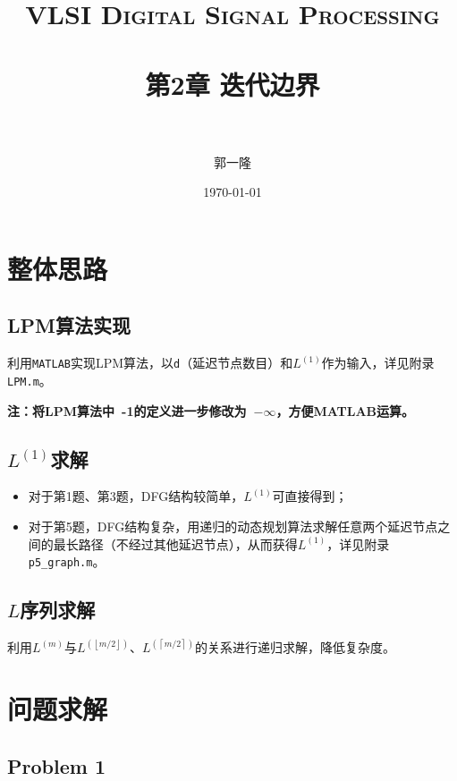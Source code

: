 \documentclass[paper=a4, fontsize=11pt]{scrartcl} %
\title{	
\normalfont \normalsize 
\textsc{VLSI Digital Signal Processing} \\ [25pt] %
\horrule{0.5pt} \\[0.4cm] %
\huge 第2章 迭代边界 \\ %
\horrule{2pt} \\[0.5cm] %
}
\author{郭一隆} %
\date{\normalsize\today} %
\begin{document}
\maketitle %

\section{整体思路}
\subsection{LPM算法实现} %
\label{sub:lpm算法实现}

利用\texttt{MATLAB}实现LPM算法，以\texttt{d}（延迟节点数目）和$L^{(1)}$作为输入，详见附录\texttt{LPM.m}。

\textbf{注：将LPM算法中~-1的定义进一步修改为~$-\infty$，方便MATLAB运算。}


\subsection{$L^{(1)}$求解} %
\label{sub:L1求解}

\begin{itemize}
    \item 对于第1题、第3题，DFG结构较简单，$L^{(1)}$可直接得到；
    \item 对于第5题，DFG结构复杂，用递归的动态规划算法求解任意两个延迟节点之间的最长路径（不经过其他延迟节点），从而获得$L^{(1)}$，详见附录\texttt{p5\_graph.m}。
\end{itemize}


\subsection{$L$序列求解} %
\label{sub:}

利用$L^{(m)}$与$L^{(\left\lfloor m/2\right\rfloor)}$、$L^{(\left\lceil m/2\right\rceil)}$的关系进行递归求解，降低复杂度。


\section{问题求解} %
\label{sec:问题求解}

\subsection{Problem 1} %
\label{sub:1}
\end{document}
